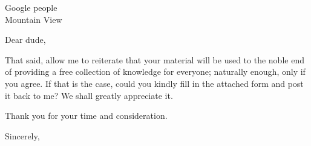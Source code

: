\documentclass{letter}
\begin{document}
\begin{letter}{Google people \\ Mountain View}
\opening{Dear dude,}
That said, allow me to reiterate that your material will be used to the noble end of
providing a free collection of knowledge for everyone; naturally enough, only if you
agree. If that is the case, could you kindly fill in the attached form and post it
back to me? We shall greatly appreciate it.

Thank you for your time and consideration.
\closing{Sincerely,}
\end{letter}
\end{document}
